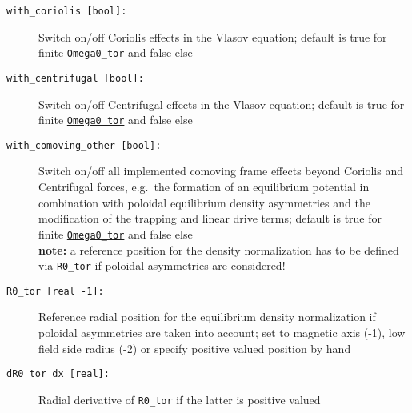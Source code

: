\documentclass[12pt]{article}
\begin{document}
\begin{description}
\item[\texttt{with\_coriolis [bool]:}] Switch on/off Coriolis effects in the Vlasov equation; default is true for finite \hyperlink{Omega0_tor}{\tt Omega0\_tor} and false else
\item[\texttt{with\_centrifugal [bool]:}] Switch on/off Centrifugal effects in the Vlasov equation; default is true for finite \hyperlink{Omega0_tor}{\tt Omega0\_tor} and false else
\item[\texttt{with\_comoving\_other [bool]:}] Switch on/off all implemented comoving frame effects beyond Coriolis and Centrifugal forces,
e.g.~the formation of an equilibrium potential in combination with poloidal equilibrium density asymmetries and the
modification of the trapping and linear drive terms; default is true for finite \hyperlink{Omega0_tor}{\tt Omega0\_tor} and false else\\
{\bf note:} a reference position for the density normalization has to be defined via {\tt R0\_tor} if poloidal asymmetries are considered!
\item[\texttt{R0\_tor [real -1]:}] Reference radial position for the equilibrium density normalization if poloidal asymmetries are taken into account;
set to magnetic axis (-1), low field side radius (-2) or specify positive valued position by hand
\item[\texttt{dR0\_tor\_dx [real]:}] Radial derivative of {\tt R0\_tor} if the latter is positive valued
\end{description}
\end{document}
